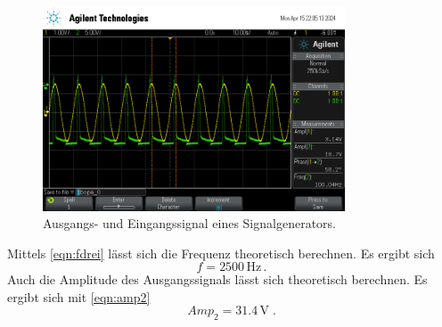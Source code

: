 \begin{figure}
    \centering
    \includegraphics[width=0.8\textwidth]{genDrei.png}
    \caption{Ausgangs- und Eingangssignal eines Signalgenerators.}
    \label{fig:genDrei}
\end{figure}
Mittels \autoref{eqn:fdrei} lässt sich die Frequenz theoretisch berechnen. Es ergibt sich
\begin{equation*}
    f = 2500 \,\unit{\hertz} \, .
\end{equation*}
Auch die Amplitude des Ausgangssignals lässt sich theoretisch berechnen. Es ergibt sich mit \autoref{eqn:amp2}
\begin{equation*}
    Amp_2 = 31.4 \,\unit{\volt}\; .
\end{equation*}

